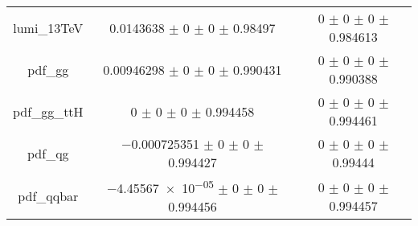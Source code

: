 \begin{table}
\begin{tabular}{ccc}
lumi\_13TeV & \num{0.0143638} $\pm$ \num{0} $\pm$ \num{0} $\pm$ \num{0.98497} & \num{0} $\pm$ \num{0} $\pm$ \num{0} $\pm$ \num{0.984613}\\
pdf\_gg & \num{0.00946298} $\pm$ \num{0} $\pm$ \num{0} $\pm$ \num{0.990431} & \num{0} $\pm$ \num{0} $\pm$ \num{0} $\pm$ \num{0.990388}\\
pdf\_gg\_ttH & \num{0} $\pm$ \num{0} $\pm$ \num{0} $\pm$ \num{0.994458} & \num{0} $\pm$ \num{0} $\pm$ \num{0} $\pm$ \num{0.994461}\\
pdf\_qg & \num{-0.000725351} $\pm$ \num{0} $\pm$ \num{0} $\pm$ \num{0.994427} & \num{0} $\pm$ \num{0} $\pm$ \num{0} $\pm$ \num{0.99444}\\
pdf\_qqbar & \num{-4.45567e-05} $\pm$ \num{0} $\pm$ \num{0} $\pm$ \num{0.994456} & \num{0} $\pm$ \num{0} $\pm$ \num{0} $\pm$ \num{0.994457}\\
\bottomrule
\end{tabular}
\end{table}